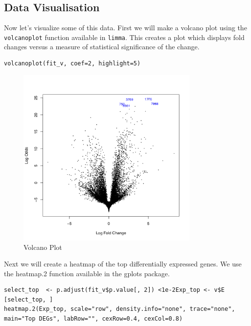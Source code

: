\begin{steps}
\section{Data Visualisation}
Now let's visualize some of this data. First we will make a volcano plot using the \texttt{volcanoplot} function available in \texttt{limma}. This creates a plot which displays fold changes versus a measure of statistical significance of the change.

\begin{steps}
\begin{lstlisting}
volcanoplot(fit_v, coef=2, highlight=5)
\end{lstlisting}
\end{steps}

\begin{figure}[H]
\centering
\includegraphics[width=0.8\textwidth]{handout/Volcano.png}
\caption{Volcano Plot}
\label{fig:Volcano plot}
\end{figure}

Next we will create a heatmap of the top differentially expressed genes. We use the heatmap.2 function available in the gplots package.
\begin{steps}
\begin{lstlisting}
select_top  <- p.adjust(fit_v$p.value[, 2]) <1e-2Exp_top <- v$E [select_top, ]
heatmap.2(Exp_top, scale="row", density.info="none", trace="none", main="Top DEGs", labRow="", cexRow=0.4, cexCol=0.8)
\end{lstlisting}
\end{steps}


\end{steps}
